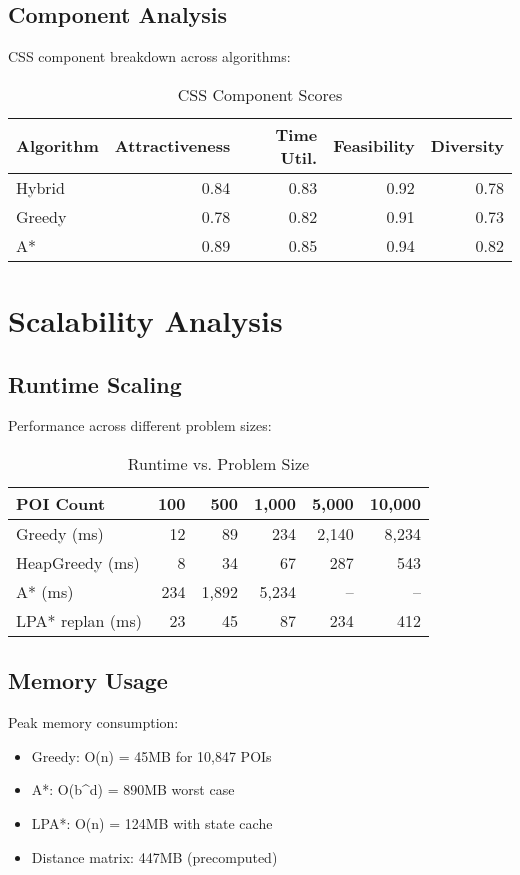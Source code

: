 \subsection{Component Analysis}

CSS component breakdown across algorithms:

\begin{table}[h]
\centering
\caption{CSS Component Scores}
\begin{tabular}{lrrrr}
\toprule
Algorithm & Attractiveness & Time Util. & Feasibility & Diversity \\
\midrule
Hybrid & 0.84 & 0.83 & 0.92 & 0.78 \\
Greedy & 0.78 & 0.82 & 0.91 & 0.73 \\
A* & 0.89 & 0.85 & 0.94 & 0.82 \\
\bottomrule
\end{tabular}
\end{table}

\section{Scalability Analysis}

\subsection{Runtime Scaling}

Performance across different problem sizes:

\begin{table}[h]
\centering
\caption{Runtime vs. Problem Size}
\begin{tabular}{lrrrrr}
\toprule
POI Count & 100 & 500 & 1,000 & 5,000 & 10,000 \\
\midrule
Greedy (ms) & 12 & 89 & 234 & 2,140 & 8,234 \\
HeapGreedy (ms) & 8 & 34 & 67 & 287 & 543 \\
A* (ms) & 234 & 1,892 & 5,234 & -- & -- \\
LPA* replan (ms) & 23 & 45 & 87 & 234 & 412 \\
\bottomrule
\end{tabular}
\end{table}

\subsection{Memory Usage}

Peak memory consumption:
\begin{itemize}
    \item Greedy: O(n) = 45MB for 10,847 POIs
    \item A*: O(b\^{}d) = 890MB worst case
    \item LPA*: O(n) = 124MB with state cache
    \item Distance matrix: 447MB (precomputed)
\end{itemize}


